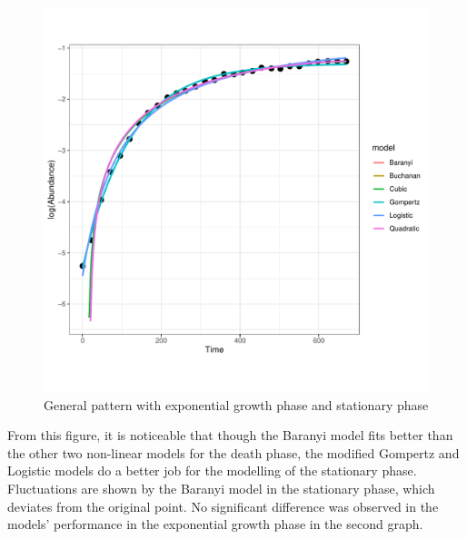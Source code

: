 \documentclass[11pt, oneside]{article}
\begin{document}
\begin{figure}[H]
\begin{center}
\begin{minipage}{.5\textwidth}
				\includegraphics[page=90, scale = 0.5]{plot_subsets.pdf}
			\end{minipage}
			\end{center}
		\caption{General pattern with exponential growth phase and stationary phase}
		\end{figure}
		
		\noindent From this figure, it is noticeable that though the Baranyi model fits better than the other two non-linear models for the death phase, the modified Gompertz and Logistic models do a better job for the modelling of the stationary phase. Fluctuations are shown by the Baranyi model in the stationary phase, which deviates from the original point. No significant difference was observed in the models' performance in the exponential growth phase in the second graph.
		
\end{document}
